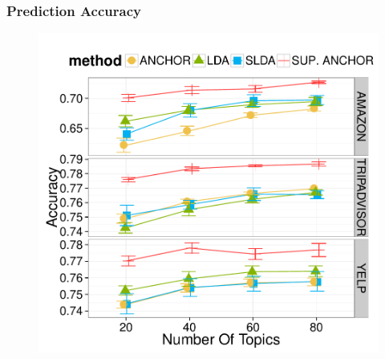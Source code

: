 \documentclass[compress]{beamer}
\newcommand{\abr}[1]{\textsc{#1}}
\newcommand{\lda}[0]{{\bf \textsc{\large{lda}}}}
\newcommand{\slda}[0]{{\bf \textsc{\large{slda}}}}
\newcommand{\ank}[0]{{\bf \textsc{\large{anchor}}}}
\newcommand{\sank}[0]{{\bf \textsc{\large{sup~anchor}}}}
\begin{document}
%

\begin{frame}
\frametitle{Prediction Accuracy}
\begin{figure}
\centering
\includegraphics[width=0.65\linewidth]{spectral/test_accuracy_ERROR.pdf}
\end{figure}

\end{frame}
\end{document}
